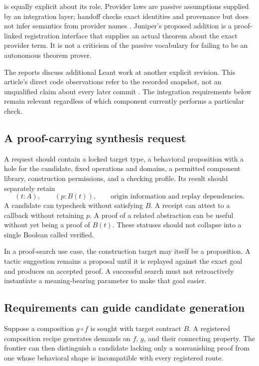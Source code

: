 \documentclass[11pt,a4paper]{article}
\newcommand{\code}[1]{\texttt{\small\detokenize{#1}}}
\theoremstyle{definition}\newtheorem{definition}[theorem]{Definition}
\theoremstyle{remark}\newtheorem{remark}[theorem]{Remark}
\begin{document}
\code{Length/Contract.hs} is equally explicit about its role. Provider laws are passive assumptions supplied by an integration layer; handoff checks exact identities and provenance but does not infer semantics from provider names \cite{lengthContract}. Juniper's proposed addition is a proof-linked registration interface that supplies an actual theorem about the exact provider term. It is not a criticism of the passive vocabulary for failing to be an autonomous theorem prover.

The reports discuss additional Leant work at another explicit revision. This article's direct code observations refer to the recorded snapshot, not an unqualified claim about every later commit \cite{synA,synB}. The integration requirements below remain relevant regardless of which component currently performs a particular check.

\subsection{A proof-carrying synthesis request}
A request should contain a locked target type, a behavioral proposition with a hole for the candidate, fixed operations and domains, a permitted component library, construction permissions, and a checking profile. Its result should separately retain
\[
  (t:A),\qquad (p:B(t)),\qquad
  \text{origin information and replay dependencies}.
\]
A candidate can typecheck without satisfying $B$. A receipt can attest to a callback without retaining $p$. A proof of a related abstraction can be useful without yet being a proof of $B(t)$. These statuses should not collapse into a single Boolean called verified.

In a proof-search use case, the construction target may itself be a proposition. A tactic suggestion remains a proposal until it is replayed against the exact goal and produces an accepted proof. A successful search must not retroactively instantiate a meaning-bearing parameter to make that goal easier.

\subsection{Requirements can guide candidate generation}
Suppose a composition $g\circ f$ is sought with target contract $B$. A registered composition recipe generates demands on $f$, $g$, and their connecting property. The frontier can then distinguish a candidate lacking only a nonvanishing proof from one whose behavioral shape is incompatible with every registered route.
\end{document}
